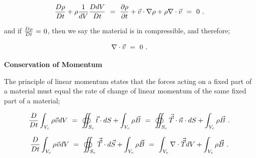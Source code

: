 \documentclass{article}
\begin{document}
\begin{equation} \label{eq:1}
\frac{D \rho}{D t} + \rho \frac{1}{dV} \frac{D dV}{D t} \hspace{0.125cm} = \hspace{0.125cm} \frac{\partial{\rho}}{\partial{t}} + \vec{v} \cdot \nabla{\rho} + \rho \nabla \cdot \vec{v} \hspace{0.125cm} = \hspace{0.125cm} 0 \hspace{0.125cm}  . 
\end{equation} 

and if \begin{math} \frac{D \rho}{D t} \hspace{0.025cm} = \hspace{0.025cm} 0 \end{math}, then we say the material is in compressible, and therefore;

\begin{equation} \label{eq:1}
\nabla \cdot \vec{v} \hspace{0.125cm} = \hspace{0.125cm} 0 \hspace{0.125cm}  . 
\end{equation} 

\vspace{0.5cm}

\textbf{Conservation of Momentum}

The principle of linear momentum states that the forces acting on a fixed part of a material must equal the rate of change of linear momentum of the same fixed part of a material;

\begin{equation} \label{eq:1}
\frac{D}{D t} \int_{V_c} \rho \vec{v} dV \hspace{0.125cm} = \hspace{0.125cm} \oiint_{S_c} \vec{t} \cdot dS + \int_{V_c} \rho \vec{B} \hspace{0.125cm} = \hspace{0.125cm} \oiint_{S_c} \vec{\vec{T}} \cdot \vec{n} \cdot dS + \int_{V_c} \rho \vec{B} \hspace{0.125cm}  . 
\end{equation}  

\begin{equation} \label{eq:1}
\frac{D}{D t} \int_{V_c} \rho \vec{v} dV \hspace{0.125cm} = \hspace{0.125cm} \oiint_{S_c} \vec{\vec{T}} \cdot d \vec{S} + \int_{V_c} \rho \vec{B} \hspace{0.125cm} = \hspace{0.125cm} \int_{V_c} \nabla \cdot \vec{\vec{T}} dV + \int_{V_c} \rho \vec{B} \hspace{0.125cm}  . 
\end{equation} 
\end{document}
